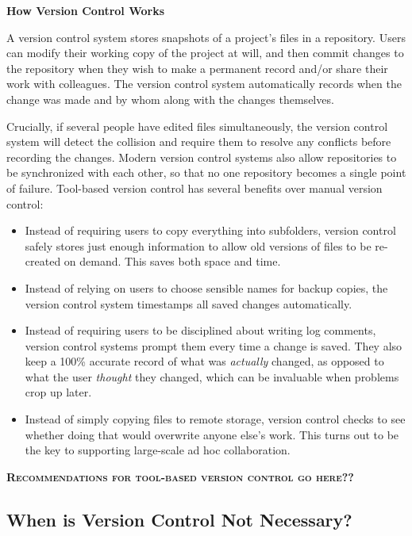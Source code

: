 \documentclass[10pt]{article}
\newcommand{\fixme}[1]{\textsc{\textbf{#1}}}
\begin{document}
\begin{framed}
  \noindent \textbf{How Version Control Works}

  A version control system stores snapshots of a project's files in a
  repository. Users can modify their working copy of the project at will,
  and then commit changes to the repository when they wish to make a
  permanent record and/or share their work with colleagues. The version
  control system automatically records when the change was made and by
  whom along with the changes themselves.
  
  Crucially, if several people have edited files simultaneously, the
  version control system will detect the collision and require them to
  resolve any conflicts before recording the changes. Modern version
  control systems also allow repositories to be synchronized with each
  other, so that no one repository becomes a single point of failure.
  Tool-based version control has several benefits over manual version
  control:

  \begin{itemize}
  \item
    Instead of requiring users to copy everything into subfolders, version
    control safely stores just enough information to allow old versions of
    files to be re-created on demand. This saves both space and time.
  \item
    Instead of relying on users to choose sensible names for backup
    copies, the version control system timestamps all saved changes
    automatically.
  \item
    Instead of requiring users to be disciplined about writing log
    comments, version control systems prompt them every time a change is
    saved. They also keep a 100\% accurate record of what was
    \emph{actually} changed, as opposed to what the user \emph{thought}
    they changed, which can be invaluable when problems crop up later.
  \item
    Instead of simply copying files to remote storage, version control
    checks to see whether doing that would overwrite anyone else's work.
    This turns out to be the key to supporting large-scale ad hoc
    collaboration.
  \end{itemize}
\end{framed}

\fixme{Recommendations for tool-based version control go here??}

\subsection*{When is Version Control Not Necessary?}
\end{document}
